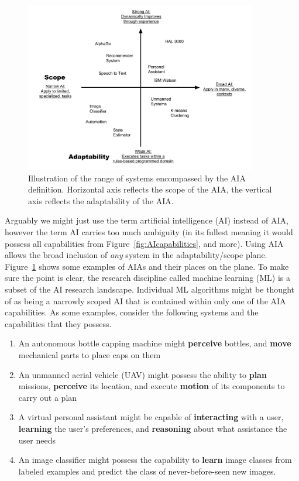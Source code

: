 	\begin{figure}[htbp]
    	\centering
     	\includegraphics[width=0.9\textwidth]{Figures/strong_weak_narrow_broad.pdf}
    	\caption{Illustration of the range of systems encompassed by the AIA definition. Horizontal axis reflects the scope of the AIA, the vertical axis reflects the adaptability of the AIA.}
        \label{fig:StrongWeak}
    \end{figure}

  Arguably we might just use the term artificial intelligence (AI) instead of AIA, however the term AI carries too much ambiguity (in its fullest meaning it would possess all capabilities from Figure~\ref{fig:AIcapabilities}, and more). Using AIA allows the broad inclusion of \emph{any} system in the adaptability/scope plane. Figure~\ref{fig:StrongWeak} shows some examples of AIAs and their places on the plane. To make sure the point is clear, the research discipline called machine learning (ML) is a subset of the AI research landscape. Individual ML algorithms might be thought of as being a narrowly scoped AI that is contained within only one of the AIA capabilities. As some examples, consider the following systems and the capabilities that they possess.

    \begin{enumerate}
         \item An autonomous bottle capping machine might \textbf{perceive} bottles, and \textbf{move} mechanical parts to place caps on them
         \item An unmanned aerial vehicle (UAV) might possess the ability to \textbf{plan} missions, \textbf{perceive} its location, and execute \textbf{motion} of its components to carry out a plan
         \item A virtual personal assistant might be capable of \textbf{interacting} with a user, \textbf{learning} the user's preferences, and \textbf{reasoning} about what assistance the user needs
         \item An image classifier might possess the capability to \textbf{learn} image classes from labeled examples and predict the class of never-before-seen new images.
     \end{enumerate}

